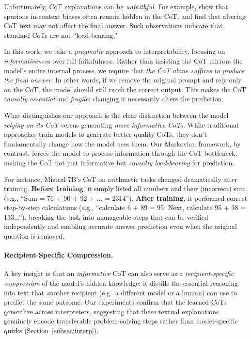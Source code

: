 \documentclass[letterpaper]{article} %
\begin{document}
Unfortunately, CoT explanations can be \emph{unfaithful}. For example, \citet{turpin2023language} show that spurious in-context biases often remain hidden in the CoT, and \citet{lanham2023measuring} find that altering CoT text may not affect the final answer. Such observations indicate that standard CoTs are not ``load-bearing.''

In this work, we take a \emph{pragmatic} approach to interpretability, focusing on \emph{informativeness} over full faithfulness. Rather than insisting the CoT mirrors the model's entire internal process, we require that \emph{the CoT alone suffices to produce the final answer}. In other words, if we remove the original prompt and rely only on the CoT, the model should still reach the correct output. This makes the CoT \emph{causally essential} and \emph{fragile}: changing it necessarily alters the prediction.

What distinguishes our approach is the clear distinction between the model \emph{relying on its CoT} versus generating \emph{more informative CoTs}. While traditional approaches train models to generate better-quality CoTs, they don't fundamentally change how the model uses them. Our Markovian framework, by contrast, forces the model to process information through the CoT bottleneck, making the CoT not just informative but \emph{causally load-bearing} for prediction.

For instance, Mistral-7B's CoT on arithmetic tasks changed dramatically after training. \textbf{Before training}, it simply listed all numbers and their (incorrect) sum (e.g., ``Sum = 76 + 90 + 92 + ... = 2314''). \textbf{After training}, it performed correct step-by-step calculations (e.g., ``calculate 6 + 89 = 95; Next, calculate 95 + 38 = 133...''), breaking the task into manageable steps that can be verified independently and enabling accurate answer prediction even when the original question is removed.

\paragraph{Recipient-Specific Compression.}
A key insight is that an \emph{informative} CoT can also serve as a \emph{recipient-specific compression} of the model's hidden knowledge: it distills the essential reasoning into text that another recipient (e.g.\ a different model or a human) can use to predict the same outcome. Our experiments confirm that the learned CoTs generalize across interpreters, suggesting that these textual explanations genuinely encode transferable problem-solving steps rather than model-specific quirks (Section~\ref{subsec:interp}).
\end{document}
